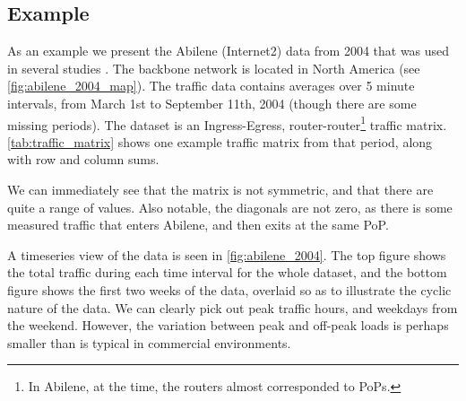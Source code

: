 \subsection{Example}

As an example we present the Abilene (Internet2) data from 2004 that
was used in several studies
\cite{Zhang05Anomography,Roughan05GravSynth,Alderson06Topology}.  The
backbone network is located in North America (see
\autoref{fig:abilene_2004_map}).  The traffic data contains averages
over 5 minute intervals, from March 1st to September 11th, 2004
(though there are some missing periods).  The dataset is an
Ingress-Egress, router-router\footnote{In Abilene, at the time, the
  routers almost corresponded to PoPs.} traffic
matrix. \autoref{tab:traffic_matrix} shows one example traffic matrix
from that period, along with row and column sums.



We can immediately see that the matrix is not symmetric, and that
there are quite a range of values. Also notable, the diagonals are not
zero, as there is some measured traffic that enters Abilene, and then
exits at the same PoP.

A timeseries view of the data is seen in 
\autoref{fig:abilene_2004}. The top figure shows the total traffic
during each time interval for the whole dataset, and the bottom figure
shows the first two weeks of the data, overlaid so as to illustrate
the cyclic nature of the data. We can clearly pick out peak traffic
hours, and weekdays from the weekend. However, the variation between
peak and off-peak loads is perhaps smaller than is typical in
commercial environments. 

